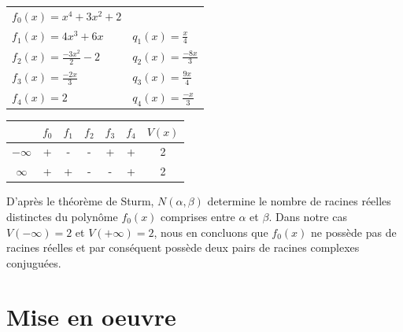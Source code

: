 \documentclass[11pt]{article}
\begin{document}
\begin{center}
  \begin{tabular}{|l|l|}
    \hline
    $f_{0}(x)=x^4+3x^2+2$&\\
    $f_1 (x) = 4x^3+6x$&$q_1 (x) = \frac{x}{4}$\\
    $f_2 (x) = \frac{-3x^2}{2}-2$&$q_2 (x) = \frac{-8x}{3}$\\
    $f_3 (x) = \frac{-2x}{3}$&$q_3 (x)=\frac{9x}{4}$\\
    $f_4 (x)=2$&$q_4 (x) = \frac{-x}{3}$\\
    \hline
  \end{tabular}\hspace{1cm}\begin{tabular}{c||c|c|c|c|c||c}
      &$f_0$&$f_1$&$f_2$&$f_3$&$f_4$&$V (x)$\\
      \hline
      $-\infty$&+&-&-&+&+&2\\
      $\infty$&+&+&-&-&+&2\\
    \end{tabular}
\end{center}

D'après le théorème de Sturm, $N(\alpha,\beta)$ determine le nombre de racines réelles distinctes
du polynôme $f_{0} (x)$ comprises entre $\alpha$ et $\beta$. Dans notre cas $V(-\infty)=2$ et $V(+\infty)=2$,
nous en concluons que $f_{0} (x)$ ne possède pas de racines réelles et par conséquent possède deux pairs
de racines complexes conjuguées.
\section*{Mise en oeuvre}
\end{document}
